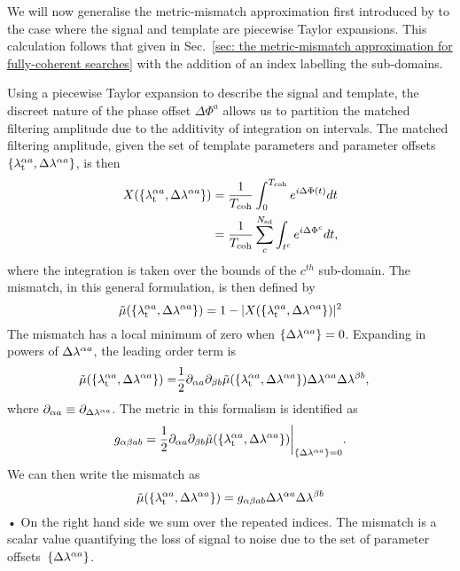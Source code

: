 \documentclass[../full_thesis/full_thesis.tex]{subfiles}
\begin{document}
We will now generalise the metric-mismatch approximation first introduced by
\citet{Brady1998} to the case where the signal and template are piecewise
Taylor expansions. This calculation follows that given in Sec.~\ref{sec: the
metric-mismatch approximation for fully-coherent searches} with the addition
of an index labelling the sub-domains.

Using a piecewise Taylor expansion
to describe the signal and template, the discreet nature of the phase offset
$\Delta\Phi^{a}$ allows us to partition the matched filtering amplitude due to
the additivity of integration on intervals. The matched filtering amplitude,
given the set of template parameters and parameter offsets $\{{\lambda}_\textrm{t}^{\alpha a},
\Delta\lambda^{\alpha a}\}$, is then
\begin{align}
\begin{split}
X(\{{\lambda}_\textrm{t}^{\alpha a}, \Delta\lambda^{\alpha a}\}) & =
\frac{1}{T_{\mathrm{coh}}}\int_{0}^{T_{\mathrm{coh}}}e^{i \Delta \Phi(t)}dt  \\
& =  \frac{1}{T_{\mathrm{coh}}}\sum_{c}^{N_{\textrm{sd}}} \int_{t^{c}}e^{i \Delta \Phi^{c}}dt,
\end{split}
\end{align}
where the integration is taken over the bounds of the $c^{th}$ sub-domain. The
mismatch, in this general formulation, is then defined by
\begin{equation}
\tilde{\mu}(\{{\lambda}_\textrm{t}^{\alpha a}, \Delta\lambda^{\alpha a}\}) =
 1 -  |X(\{{\lambda}_\textrm{t}^{\alpha a}, \Delta\lambda^{\alpha a}\})|^{2}
\end{equation}
The mismatch has a local minimum of zero when $\{\Delta\lambda^{\alpha a}\}=0$. Expanding in powers of
$\Delta\lambda^{\alpha a}$, the leading order term is
\begin{align}
\begin{split}
\tilde{\mu}(\{{\lambda}_\textrm{t}^{\alpha a}, \Delta\lambda^{\alpha a}\}) =
 & \frac{1}{2} \partial_{\alpha a} \partial_{\beta b}
                \tilde{\mu}(\{{\lambda}_\textrm{t}^{\alpha a}, \Delta\lambda^{\alpha a}\})
                \Delta\lambda^{\alpha a}\Delta\lambda^{\beta b},
\label{eqn: mismatch expansion}
\end{split}
\end{align}
where $\partial_{\alpha a} \equiv \partial_{\Delta\lambda^{\alpha a}}$.  The metric in
this formalism is identified as
\begin{equation}
g_{\alpha\beta ab} =
\frac{1}{2} \partial_{\alpha a} \partial_{\beta b}
            \tilde{\mu}(\{{\lambda}_\textrm{t}^{\alpha a}, \Delta\lambda^{\alpha a}\})
            \biggr\rvert_{\{\Delta\lambda^{\alpha a}\}=0}.
\end{equation}
We can then write the mismatch as
\begin{equation}
\tilde{\mu}(\{{\lambda}_\textrm{t}^{\alpha a}, \Delta\lambda^{\alpha a}\}) =
 g_{\alpha\beta ab} \Delta\lambda^{\alpha a}\Delta\lambda^{\beta b}
\label{eqn: mismatch}
\end{equation}•
On the right hand side we sum over the repeated indices. The mismatch is a
scalar value quantifying the loss of signal to noise due to the set of
parameter offsets~$\{\Delta\lambda^{\alpha a}\}$.
\end{document}
